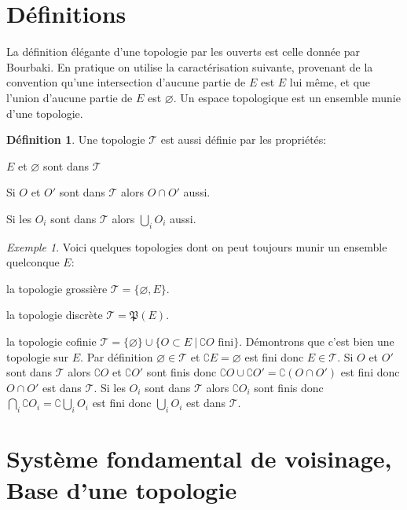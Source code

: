 \documentclass[a4paper, 11pt, french]{book}
\newenvironment{itemise}{\itemize}{\enditemize}
\theoremstyle{plain} %
\theoremstyle{definition} %
\newtheorem{definition}{Définition}
\theoremstyle{remark} %
\newtheorem{exemple}{Exemple}
\newcommand{\1}{\mathds{1}}
\newcommand\vide{\varnothing}
\begin{document}
\section{Définitions}

La définition élégante d'une topologie par les ouverts est celle donnée par Bourbaki.
En pratique on utilise la caractérisation suivante, provenant de la convention qu'une intersection d'aucune partie de $E$ est $E$ lui même, et que l'union d'aucune partie de $E$ est $\vide$.
Un espace topologique est un ensemble munie d'une topologie.

\begin{definition}
	Une topologie $\mathscr{T}$ est aussi définie par les propriétés:
	\begin{itemise}
		\item $E$ et $\vide$ sont dans $\mathscr{T}$
		\item Si $O$ et $O'$ sont dans $\mathscr{T}$ alors $O\cap O'$ aussi.
		\item Si les $O_i$ sont dans $\mathscr{T}$ alors $\bigcup_iO_i$ aussi.
	\end{itemise}
\end{definition}

\begin{exemple}
	Voici quelques topologies dont on peut toujours munir un ensemble quelconque $E$:
	\begin{itemise}
		\item la topologie grossière $\mathscr{T}=\{\vide, E\}$.
		\item la topologie discrète $\mathscr{T}=\mathfrak{P}(E)$.
		\item la topologie cofinie $\mathscr{T}=\{\vide\}\cup\{O\subset E\ |\ \complement O\text{ fini}\}$.
		Démontrons que c'est bien une topologie sur $E$.
		Par définition $\vide\in\mathscr{T}$ et $\complement E=\vide$ est fini donc $E\in\mathscr{T}$.
		Si $O$ et $O'$ sont dans $\mathscr{T}$ alors $\complement O$ et $\complement O'$ sont finis donc $\complement O\cup\complement O'=\complement(O\cap O')$ est fini donc $O\cap O'$ est dans $\mathscr{T}$.
		Si les $O_i$ sont dans $\mathscr{T}$ alors $\complement O_i$ sont finis donc $\bigcap_i\complement O_i=\complement\bigcup_iO_i$ est fini donc $\bigcup_iO_i$ est dans $\mathscr{T}$.
	\end{itemise}
\end{exemple}

\section{Système fondamental de voisinage, Base d'une topologie}
\end{document}

